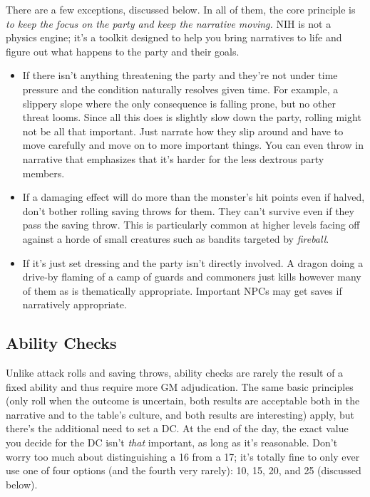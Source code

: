 \documentclass[10pt,twoside,openany,bg=none]{dndbook}
\begin{document}
There are a few exceptions, discussed below. In all of them, the core principle is \textit{to keep the focus on the party and keep the narrative moving.} NIH is not a physics engine; it's a toolkit designed to help you bring narratives to life and figure out what happens to the party and their goals.
\begin{itemize}
    \item If there isn't anything threatening the party and they're not under time pressure and the condition naturally resolves given time. For example, a slippery slope where the only consequence is falling prone, but no other threat looms. Since all this does is slightly slow down the party, rolling might not be all that important. Just narrate how they slip around and have to move carefully and move on to more important things. You can even throw in narrative that emphasizes that it's harder for the less dextrous party members.
    \item If a damaging effect will do more than the monster's hit points even if halved, don't bother rolling saving throws for them. They can't survive even if they pass the saving throw. This is particularly common at higher levels facing off against a horde of small creatures such as bandits targeted by \textit{fireball}.
    \item If it's just set dressing and the party isn't directly involved. A dragon doing a drive-by flaming of a camp of guards and commoners just kills however many of them as is thematically appropriate. Important NPCs may get saves if narratively appropriate.
\end{itemize}

\subsection{Ability Checks}
Unlike attack rolls and saving throws, ability checks are rarely the result of a fixed ability and thus require more GM adjudication. The same basic principles (only roll when the outcome is uncertain, both results are acceptable both in the narrative and to the table's culture, and both results are interesting) apply, but there's the additional need to set a DC. At the end of the day, the exact value you decide for the DC isn't \textit{that} important, as long as it's reasonable. Don't worry too much about distinguishing a 16 from a 17; it's totally fine to only ever use one of four options (and the fourth very rarely): 10, 15, 20, and 25 (discussed below).
\end{document}
